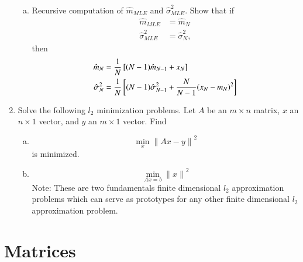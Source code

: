 \documentclass[journal,12pt,twocolumn]{IEEEtran}
\begin{document}
\begin{enumerate}[1.]
\begin{enumerate}[(a)]
\item Recursive computation of $\hat{m}_{MLE}$ and $\hat{\sigma}^2_{MLE}$. Show that if 
\begin{align}
\hat{m}_{MLE}&=\hat{m}_{N}
\\
\hat{\sigma}^2_{MLE}&=\hat{\sigma}^2_{N},
\end{align}
then
\begin{align}
\hat{m}_{N}&=\frac{1}{N}{}\left[(N-1)\hat{m}_{N-1}+x_{N}\right]
\\
\hat{\sigma}^2_{N}&=\frac{1}{N}{}\left[(N-1)\hat{\sigma}^2_{N-1}+\frac{N}{N-1}(x_{N}-m_{N})^2\right]
\end{align}
\end{enumerate}
%
\item Solve the following $l_2$ minimization problems. Let $A$ be an $m \times n$ matrix, $x$ an $n \times 1$ vector, and $y$ an $m \times 1$ vector. Find 
%
\begin{enumerate}[(a)]
\item 
\begin{equation}
\min_{x}{\|A{x}-y\|}^2
\end{equation}
%
is minimized.
\item  
\begin{equation}
\min_{Ax=b}{\|{x}\|}^2
\end{equation}
Note: These are two fundamentals finite dimensional $l_2$ approximation problems which can serve as prototypes for any other finite 
dimensional $l_2$ approximation problem.
\end{enumerate}
\end{enumerate}
%
\section{Matrices}
\end{document}
